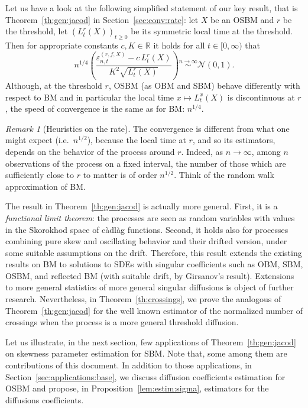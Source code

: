 \documentclass[12pt]{article}
\numberwithin{equation}{section}
\theoremstyle{definition}
\theoremstyle{remark}
\newtheorem{remark}{Remark}
\newcommand{\RR}{\mathbb{R}}
\begin{document}
Let us have a look at the following simplified statement of our key result, that is Theorem~\ref{th:gen:jacod} in Section~\ref{sec:conv:rate}: 
let $X$ be an OSBM and $r$ be the threshold, let $(L^r_t(X))_{t\geq 0}$ be its symmetric local time at the threshold. 
Then for appropriate constants $c,K\in \RR$ it holds for all $t\in [0,\infty)$ that
\begin{equation}  \label{intro:th}
	n^{1/4} \left( \frac{ \varepsilon_{n,t}^{(r,f,X)} - c \, L^r_t(X)}{K^2 \sqrt{L^r_t(X)}}\right) \overset{n\to\infty}{\sim} \mathcal{N}(0,1).
\end{equation}
%
%
Although, at the threshold $r$, OSBM (as OBM and SBM) behave differently with respect to BM and in particular the local time $x \mapsto L^x_t(X)$ is discontinuous at $r$,
the speed of convergence is the same as for BM: $n^{1/4}$. 
\begin{remark}[Heuristics on the rate]
The convergence is different from what one might expect (i.e.~$n^{1/2}$), because the local time at $r$, and so its estimators, depends on the behavior of the process around $r$.
Indeed, as $n\to\infty$, among $n$ observations of the process on a fixed interval, the number of those which are sufficiently close to $r$ to matter is of order $n^{1/2}$.
Think of the random walk approximation of BM.
\end{remark}
%

The result in Theorem~\ref{th:gen:jacod} is actually more general. First, it is a {\em functional limit theorem\/}: the processes are seen as random variables with values in the Skorokhod space of c\`adl\`ag functions. Second, it holds also for 
processes combining pure skew and oscillating behavior and their drifted version,
under some suitable assumptions on the drift.
Therefore, this result extends the existing results on BM to solutions to SDEs with singular coefficients such as OBM, SBM, OSBM, and reflected BM (with suitable drift, by Girsanov's result). 
%
Extensions to more general statistics of 
more general singular diffusions 
is object of further research.
Nevertheless, in Theorem~\ref{th:crossings}, we prove the analogous of Theorem~\ref{th:gen:jacod} for the well known estimator of the normalized number of crossings when the process is a more general threshold diffusion. 

Let us illustrate, in the next section, few applications of Theorem~\ref{th:gen:jacod} on skewness parameter estimation for SBM. 
Note that, some among them are contributions of this document. 
In addition to those applications, in Section~\ref{sec:applications:base}, we discuss diffusion coefficients estimation for OSBM and propose, in Proposition~\ref{lem:estim:sigma}, estimators for the diffusions coefficients.
\end{document}
